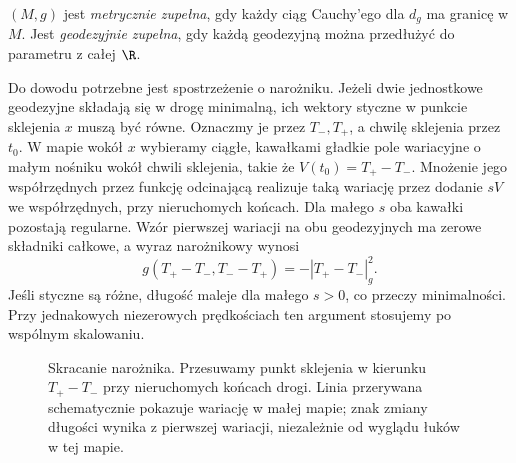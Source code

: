 \begin{definicja}
\label{def:zupelnosc-geodezyjna}
$(M,g)$ jest \emph{metrycznie zupełna}, gdy
każdy ciąg Cauchy'ego dla $d_g$ ma granicę w $M$.
Jest \emph{geodezyjnie zupełna}, gdy każdą
geodezyjną można przedłużyć do parametru
z całej $\R$.
\end{definicja}

Do dowodu potrzebne jest spostrzeżenie o narożniku.
Jeżeli dwie jednostkowe geodezyjne składają się w drogę
minimalną, ich wektory styczne w punkcie sklejenia $x$
muszą być równe. Oznaczmy je przez $T_-,T_+$,
a chwilę sklejenia przez $t_0$.
W mapie wokół $x$ wybieramy ciągłe, kawałkami gładkie
pole wariacyjne o małym nośniku wokół chwili sklejenia,
takie że $V(t_0)=T_+-T_-$. Mnożenie jego współrzędnych
przez funkcję odcinającą realizuje taką wariację przez
dodanie $sV$ we współrzędnych, przy nieruchomych końcach.
Dla małego $s$ oba kawałki pozostają regularne.
Wzór pierwszej wariacji na obu geodezyjnych ma zerowe
składniki całkowe, a wyraz narożnikowy wynosi
\[
 g(T_+-T_-,T_--T_+)=-|T_+-T_-|_g^2.
\]
Jeśli styczne są różne, długość maleje dla małego $s>0$,
co przeczy minimalności. Przy jednakowych niezerowych
prędkościach ten argument stosujemy po wspólnym skalowaniu.

\begin{figure}[H]
\centering
{}
\caption{Skracanie narożnika. Przesuwamy punkt sklejenia
w kierunku $T_+-T_-$ przy nieruchomych końcach drogi.
Linia przerywana schematycznie pokazuje wariację
w małej mapie; znak zmiany długości wynika z pierwszej
wariacji, niezależnie od wyglądu łuków w tej mapie.}
\label{fig:hopf-skracanie-naroznika}
\end{figure}

